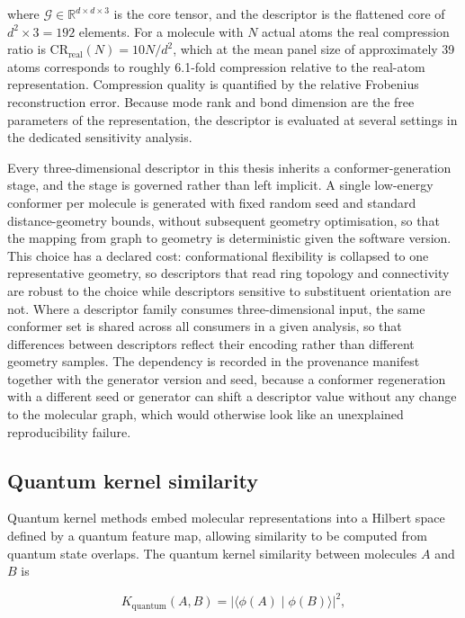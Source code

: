 where $\mathcal{G} \in \mathbb{R}^{d \times d \times 3}$ is the core tensor, and the descriptor is the flattened core of $d^{2} \times 3 = \num{192}$ elements. For a molecule with $N$ actual atoms the real compression ratio is $\mathrm{CR}_{\mathrm{real}}(N) = 10N / d^{2}$, which at the mean panel size of approximately \num{39} atoms corresponds to roughly \num{6.1}-fold compression relative to the real-atom representation. Compression quality is quantified by the relative Frobenius reconstruction error. Because mode rank and bond dimension are the free parameters of the representation, the descriptor is evaluated at several settings in the dedicated sensitivity analysis.

Every three-dimensional descriptor in this thesis inherits a conformer-generation stage, and the stage is governed rather than left implicit. A single low-energy conformer per molecule is generated with fixed random seed and standard distance-geometry bounds, without subsequent geometry optimisation, so that the mapping from graph to geometry is deterministic given the software version. This choice has a declared cost: conformational flexibility is collapsed to one representative geometry, so descriptors that read ring topology and connectivity are robust to the choice while descriptors sensitive to substituent orientation are not. Where a descriptor family consumes three-dimensional input, the same conformer set is shared across all consumers in a given analysis, so that differences between descriptors reflect their encoding rather than different geometry samples. The dependency is recorded in the provenance manifest together with the generator version and seed, because a conformer regeneration with a different seed or generator can shift a descriptor value without any change to the molecular graph, which would otherwise look like an unexplained reproducibility failure.

\subsection{Quantum kernel similarity}

Quantum kernel methods embed molecular representations into a Hilbert space defined by a quantum feature map, allowing similarity to be computed from quantum state overlaps. The quantum kernel similarity between molecules $A$ and $B$ is

\begin{equation}
K_{\mathrm{quantum}}(A, B) = \left| \langle \phi(A) \mid \phi(B) \rangle \right|^{2},
\end{equation}

